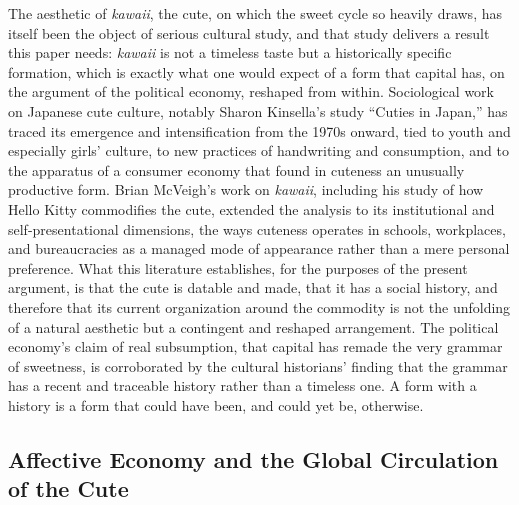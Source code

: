 The aesthetic of \textit{kawaii}, the cute, on which the sweet cycle so heavily draws, has itself been the object of serious cultural study, and that study delivers a result this paper needs: \textit{kawaii} is not a timeless taste but a historically specific formation, which is exactly what one would expect of a form that capital has, on the argument of the political economy, reshaped from within. Sociological work on Japanese cute culture, notably Sharon Kinsella's study ``Cuties in Japan,'' has traced its emergence and intensification from the 1970s onward, tied to youth and especially girls' culture, to new practices of handwriting and consumption, and to the apparatus of a consumer economy that found in cuteness an unusually productive form. Brian McVeigh's work on \textit{kawaii}, including his study of how Hello Kitty commodifies the cute, extended the analysis to its institutional and self-presentational dimensions, the ways cuteness operates in schools, workplaces, and bureaucracies as a managed mode of appearance rather than a mere personal preference. What this literature establishes, for the purposes of the present argument, is that the cute is datable and made, that it has a social history, and therefore that its current organization around the commodity is not the unfolding of a natural aesthetic but a contingent and reshaped arrangement. The political economy's claim of real subsumption, that capital has remade the very grammar of sweetness, is corroborated by the cultural historians' finding that the grammar has a recent and traceable history rather than a timeless one. A form with a history is a form that could have been, and could yet be, otherwise.

\subsection{Affective Economy and the Global Circulation of the Cute}

